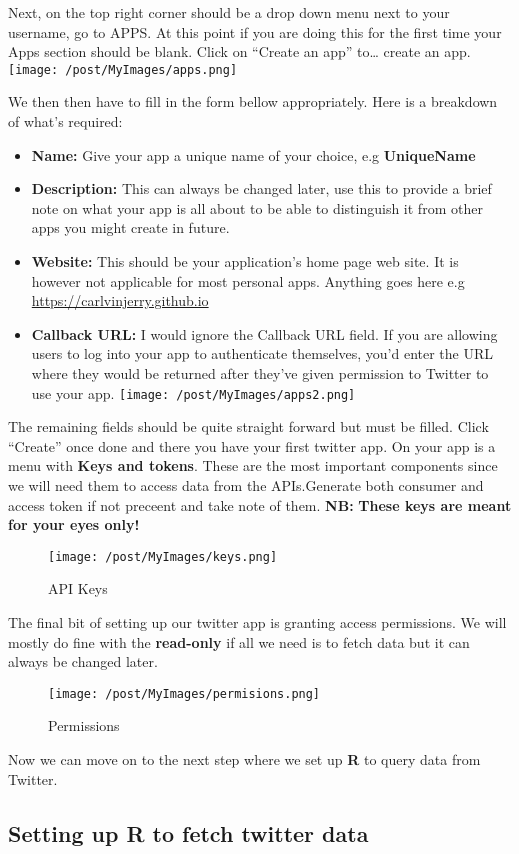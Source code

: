 \documentclass[]{article}
\providecommand{\tightlist}{%
  \setlength{\itemsep}{0pt}\setlength{\parskip}{0pt}}
\begin{document}
Next, on the top right corner should be a drop down menu next to your
username, go to APPS. At this point if you are doing this for the first
time your Apps section should be blank. Click on ``Create an app''
to\ldots{} create an app. \texttt{[image: /post/MyImages/apps.png]}

We then then have to fill in the form bellow appropriately. Here is a
breakdown of what's required:

\begin{itemize}
\tightlist
\item
  \textbf{Name:} Give your app a unique name of your choice, e.g
  \textbf{UniqueName}
\item
  \textbf{Description:} This can always be changed later, use this to
  provide a brief note on what your app is all about to be able to
  distinguish it from other apps you might create in future.
\item
  \textbf{Website:} This should be your application's home page web
  site. It is however not applicable for most personal apps. Anything
  goes here e.g \url{https://carlvinjerry.github.io}
\item
  \textbf{Callback URL:} I would ignore the Callback URL field. If you
  are allowing users to log into your app to authenticate themselves,
  you'd enter the URL where they would be returned after they've given
  permission to Twitter to use your app.
  \texttt{[image: /post/MyImages/apps2.png]}
\end{itemize}

The remaining fields should be quite straight forward but must be
filled. Click ``Create'' once done and there you have your first twitter
app. On your app is a menu with \textbf{Keys and tokens}. These are the
most important components since we will need them to access data from
the APIs.Generate both consumer and access token if not preceent and
take note of them. \textbf{NB:} \textbf{These keys are meant for your
eyes only!}

\begin{figure}
\centering
\texttt{[image: /post/MyImages/keys.png]}
\caption{API Keys}
\end{figure}

The final bit of setting up our twitter app is granting access
permissions. We will mostly do fine with the \textbf{read-only} if all
we need is to fetch data but it can always be changed later.

\begin{figure}
\centering
\texttt{[image: /post/MyImages/permisions.png]}
\caption{Permissions}
\end{figure}

Now we can move on to the next step where we set up \textbf{R} to query
data from Twitter.

\subsection{Setting up R to fetch twitter
data}\label{setting-up-r-to-fetch-twitter-data}
\end{document}
